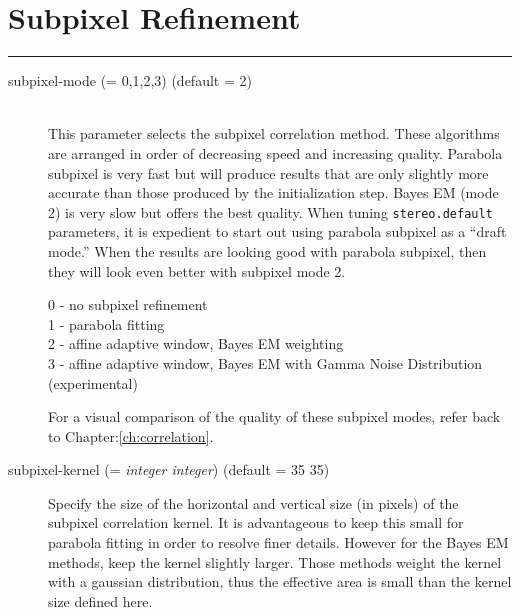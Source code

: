 \section{Subpixel Refinement}
\hrule
\bigskip

\begin{description}

\item[subpixel-mode \textnormal{\small{(= 0,1,2,3)}} (default = 2)] \hfill \\
  This parameter selects the subpixel correlation method. These
  algorithms are arranged in order of decreasing speed and increasing
  quality. Parabola subpixel is very fast but will produce results
  that are only slightly more accurate than those produced by the
  initialization step. Bayes EM (mode 2) is very slow but offers the
  best quality. When tuning {\tt stereo.default} parameters, it is
  expedient to start out using parabola subpixel as a ``draft mode.''
  When the results are looking good with parabola subpixel, then they
  will look even better with subpixel mode 2.

  \begin{description}
    \item[0 - no subpixel refinement]
    \item[1 - parabola fitting ]
    \item[2 - affine adaptive window, Bayes EM weighting ]
    \item[3 - affine adaptive window, Bayes EM with Gamma Noise Distribution (experimental) ]
  \end{description}

  For a visual comparison of the quality of these subpixel modes,
  refer back to Chapter:\ref{ch:correlation}.

\item[subpixel-kernel \textnormal{\small{(= \emph{integer integer})}} (default = 35 35)]
  Specify the size of the horizontal and vertical size (in pixels) of
  the subpixel correlation kernel. It is advantageous to keep this
  small for parabola fitting in order to resolve finer
  details. However for the Bayes EM methods, keep the kernel slightly
  larger. Those methods weight the kernel with a gaussian
  distribution, thus the effective area is small than the kernel size
  defined here.

\end{description}


